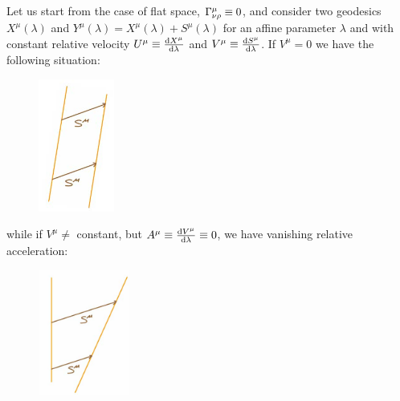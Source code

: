\documentclass[../main/main.tex]{subfiles}
\begin{document}
Let us start from the case of flat space, ${\Gamma}^{\mu}_{\nu \rho}\equiv0$, and consider two geodesics $X^\mu(\lambda)$ and $Y^\mu(\lambda)=X^\mu(\lambda)+S^\mu(\lambda)$ for an affine parameter $\lambda$ and with constant relative velocity $U^\mu\equiv\frac{\textup{d} X^\mu}{\textup{d} \lambda}$ and $V^\mu\equiv\frac{\textup{d} S^\mu}{\textup{d} \lambda}$. 
If $V^\mu=0$ we have the following situation:
\begin{figure}[H]
\centering
\includegraphics[width=2.5cm]{../img/geodesic-deviation-v0.jpg}
\end{figure}
\noindent
while if $V^\mu\neq$ constant, but $A^\mu\equiv\frac{\textup{d} V^\mu}{\textup{d} \lambda}\equiv0$, we have vanishing relative acceleration:
\begin{figure}[H]
\centering
\includegraphics[width=3cm]{../img/geodesic-deviation-vnot0.jpg}
\end{figure}
\end{document}
